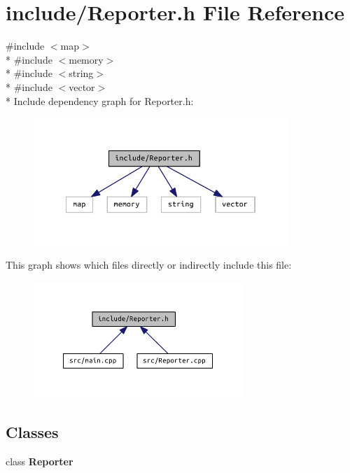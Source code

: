 \section{include/\+Reporter.h File Reference}
\label{_reporter_8h}
{\ttfamily \#include $<$map$>$}\\*
{\ttfamily \#include $<$memory$>$}\\*
{\ttfamily \#include $<$string$>$}\\*
{\ttfamily \#include $<$vector$>$}\\*
Include dependency graph for Reporter.\+h\+:\nopagebreak
\begin{figure}[H]
\begin{center}
\leavevmode
\includegraphics[width=272pt]{_reporter_8h__incl}
\end{center}
\end{figure}
This graph shows which files directly or indirectly include this file\+:\nopagebreak
\begin{figure}[H]
\begin{center}
\leavevmode
\includegraphics[width=224pt]{_reporter_8h__dep__incl}
\end{center}
\end{figure}
\subsection*{Classes}
\begin{DoxyCompactItemize}
\item 
class {\bf Reporter}
\end{DoxyCompactItemize}
